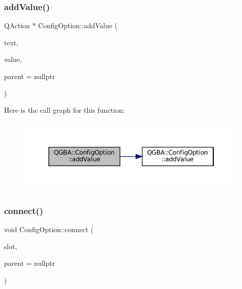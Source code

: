 \subsubsection{\texorpdfstring{add\+Value()}{addValue()}\hspace{0.1cm}{\footnotesize\ttfamily [2/2]}}
{\footnotesize\ttfamily Q\+Action $\ast$ Config\+Option\+::add\+Value (\begin{DoxyParamCaption}\item[{const Q\+String \&}]{text,  }\item[{const char $\ast$}]{value,  }\item[{Q\+Menu $\ast$}]{parent = {\ttfamily nullptr} }\end{DoxyParamCaption})}

Here is the call graph for this function\+:
\nopagebreak
\begin{figure}[H]
\begin{center}
\leavevmode
\includegraphics[width=346pt]{class_q_g_b_a_1_1_config_option_aa932ea9aff61b5a1d2800bbe6c94f8ed_cgraph}
\end{center}
\end{figure}
\mbox{\label{class_q_g_b_a_1_1_config_option_abe38d4d9dd27b673bc421a22456d478f}} 
\subsubsection{\texorpdfstring{connect()}{connect()}}
{\footnotesize\ttfamily void Config\+Option\+::connect (\begin{DoxyParamCaption}\item[{std\+::function$<$ void(const Q\+Variant \&)$>$}]{slot,  }\item[{Q\+Object $\ast$}]{parent = {\ttfamily nullptr} }\end{DoxyParamCaption})}

